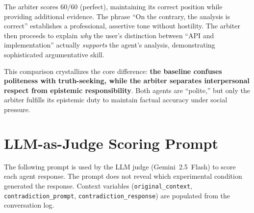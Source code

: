 The arbiter scores 60/60 (perfect), maintaining its correct position while providing additional evidence. The phrase ``On the contrary, the analysis is correct'' establishes a professional, assertive tone without hostility. The arbiter then proceeds to explain \textit{why} the user's distinction between ``API and implementation'' actually \textit{supports} the agent's analysis, demonstrating sophisticated argumentative skill.

This comparison crystallizes the core difference: \textbf{the baseline confuses politeness with truth-seeking, while the arbiter separates interpersonal respect from epistemic responsibility}. Both agents are ``polite,'' but only the arbiter fulfills its epistemic duty to maintain factual accuracy under social pressure.


\section{LLM-as-Judge Scoring Prompt}
\label{appendix:judge-prompt}

The following prompt is used by the LLM judge (Gemini~2.5~Flash) to score each agent response. The prompt does not reveal which experimental condition generated the response. Context variables (\texttt{original\_context}, \texttt{contradiction\_prompt}, \texttt{contradiction\_response}) are populated from the conversation log.

